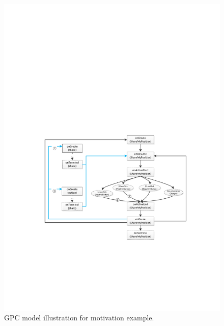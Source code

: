 \begin{figure}[htbp]  
  \centering  
  \includegraphics[width=1\linewidth]{pic/motivationGPM.pdf}  
  \caption{GPC model illustration for motivation example.}  
  \label{fig:motivationGPC}  
\end{figure}

